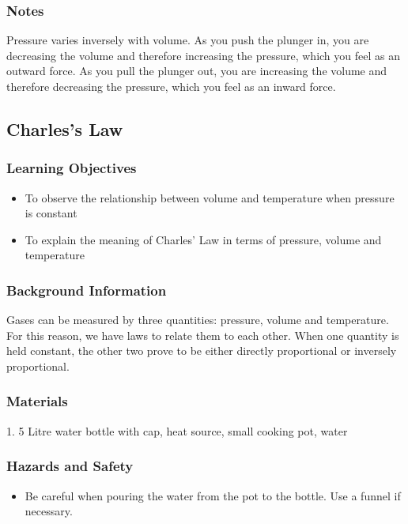 \subsubsection*{Notes}
Pressure varies inversely with volume. As you push the plunger in, you are decreasing the volume and therefore increasing the pressure, which you feel as an outward force.  
As you pull the plunger out, you are increasing the volume and therefore decreasing the pressure, which you feel as an inward force.  


\subsection{Charles's Law}

\subsubsection*{Learning Objectives}
\begin{itemize}
\item{To observe the relationship between volume and temperature when pressure is constant} 
\item{To explain the meaning of Charles' Law in terms of pressure, volume and temperature} 
\end{itemize}

\subsubsection*{Background Information}
Gases can be measured by three quantities: pressure, volume and temperature. For this reason, we have laws to relate them to each other. When one quantity is held constant, the other two prove to be either directly proportional or inversely proportional.  

\subsubsection*{Materials}
1.  5 Litre water bottle with cap, heat source, small cooking pot, water

\subsubsection*{Hazards and Safety}
\begin{itemize}
\item{Be careful when pouring the water from the pot to the bottle. Use a funnel if necessary.} 
\end{itemize}

